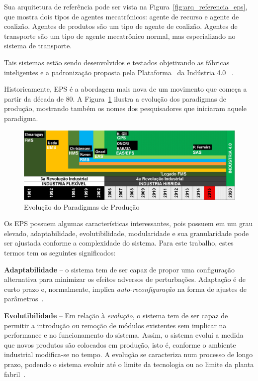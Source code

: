 Sua arquitetura de referência pode ser vista na Figura~\ref{fig:arq_referencia_eps}, que mostra dois tipos de agentes mecatrônicos: agente de recurso e agente de coalizão. Agentes de produtos são um tipo de agente de coalizão. Agentes de transporte são um tipo de agente mecatrônico normal, mas especializado no sistema de transporte.

Tais sistemas estão sendo desenvolvidos e testados objetivando as fábricas inteligentes e a padronização proposta pela Plataforma~\cite{VDE2014} da Indústria 4.0 ~\cite{DRATH2014}. 

Historicamente, EPS é a abordagem mais nova de um movimento que começa a partir da década de 80. A Figura~\ref{fig:evolucao_paradigmas} ilustra a evolução dos paradigmas de produção, mostrando também os nomes dos pesquisadores que iniciaram aquele paradigma.

\begin{figure}[b]
	\centering
	\includegraphics[width=\textwidth]{img/F8_2_SIAPE_PARADIGMAS.jpg}
	\caption{Evolução do Paradigmas de Produção}
	\label{fig:evolucao_paradigmas}
\end{figure}

Os EPS possuem algumas características interessantes, pois possuem em um grau elevado, adaptabilidade, evolutibilidade, modularidade e sua granularidade pode ser ajustada conforme a complexidade do sistema. Para este trabalho, estes termos tem os seguintes significados:

\textbf{Adaptabilidade} -- o sistema tem de ser capaz de propor uma configuração alternativa para minimizar os efeitos adversos de perturbações. Adaptação é de curto prazo e, normalmente, implica \textit{auto-reconfiguração} na forma de ajustes de parâmetros~\cite{ROSA2013c}.

\textbf{Evolutibilidade} -- 
Em relação à \textit{evolução}, o sistema tem de ser capaz de permitir a introdução ou remoção de módulos existentes sem implicar na performance e no funcionamento do sistema. Assim, o sistema evolui a medida que novos produtos são colocados em produção, isto é, conforme o ambiente industrial modifica-se no tempo. A evolução se caracteriza num processo de longo prazo, podendo o sistema evoluir até o limite da tecnologia ou ao limite da planta fabril~\cite{ROSA2013c}.

